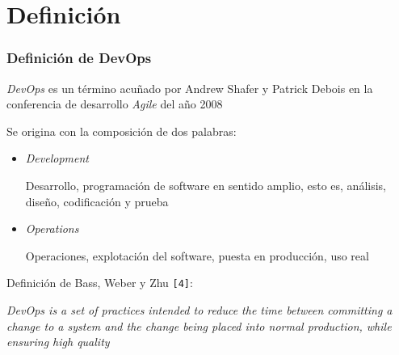 \documentclass[ucs]{beamer}
\begin{document}
\section{Definición}
\begin{frame}[fragile]
\frametitle{Definición de DevOps}
\emph{DevOps} 
es un término acuñado por Andrew Shafer y Patrick Debois
en la conferencia de desarrollo \emph{Agile} del año 2008

Se origina con
la composición de dos palabras:

\begin{itemize}
\item
\emph{Development} 

Desarrollo, programación de software en sentido amplio, esto es, análisis, diseño, codificación y prueba

\item
\emph{Operations} 

Operaciones, explotación del software, puesta en producción, uso real
\end{itemize}


Definición de
Bass, Weber y Zhu \verb|[4]|:

\emph{DevOps is a set of practices intended to reduce the time between committing a change to a system and the change being placed into normal production, while ensuring high quality}

\end{frame}
\end{document}
